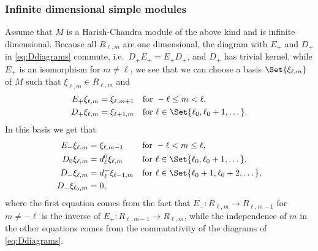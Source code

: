 \subsubsection{Infinite dimensional simple modules}

Assume that $M$ is a Harish-Chandra module of the above kind and is infinite dimensional. Because all $R_{\ell,m}$ are one dimensional, the diagram with $E_+$ and $D_+$ in \cref{eq:Ddiagrams} commute, i.e.\ $D_+E_+=E_+D_+$, and $D_+$ has trivial kernel, while $E_+$ is an isomorphism for $m\neq \ell$, we see that we can choose a basis $\Set{\xi_{\ell,m}}$ of $M$ such that $\xi_{\ell,m}\in R_{\ell,m}$ and
\begin{align*}
  E_+ \xi_{\ell,m} &= \xi_{\ell,m+1} && \mbox{for }-\ell\leq m<\ell,\\
  D_+ \xi_{\ell,m} &= \xi_{\ell+1,m} && \mbox{for }\ell\in\Set{\ell_0,\ell_0+1,\dotsc}.
\end{align*}
In this basis we get that
\begin{align}\label{eq:EandDnewbasis}
  \begin{aligned}
    E_- \xi_{\ell,m} &= \xi_{\ell,m-1} && \mbox{for }-\ell<m\leq \ell, \\
    D_0 \xi_{\ell,m} &= d_\ell^0 \xi_{\ell,m} && \mbox{for }\ell\in\Set{\ell_0,\ell_0+1,\dotsc},\\
    D_- \xi_{\ell,m} &= d_\ell^- \xi_{\ell-1,m} && \mbox{for }\ell\in\Set{\ell_0+1,\ell_0+2,\dotsc},\\
    D_- \xi_{\ell_0,m} &= 0,
  \end{aligned}
\end{align}
where the first equation comes from the fact that $E_-\colon R_{\ell,m}\to R_{\ell,m-1}$ for $m\neq -\ell$ is the inverse of $E_+\colon R_{\ell,m-1}\to R_{\ell,m}$, while the independence of $m$ in the other equations comes from the commutativity of the diagrams of \cref{eq:Ddiagrams}.

